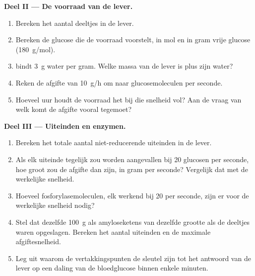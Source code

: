 \begin{problem}
\medskip
\noindent\textbf{Deel II --- De voorraad van de lever.}
\begin{enumerate}[resume]
  \item Bereken het aantal deeltjes in de lever.
  \item Bereken de glucose die de voorraad voorstelt, in mol en in gram
        vrije glucose (\qty{180}{g/mol}).
  \item {} bindt \qty{3}{g} water per gram. Welke massa van de lever
        is  plus zijn water?
  \item Reken de afgifte van \qty{10}{g/h} om naar glucosemoleculen per
        seconde.
  \item Hoeveel uur houdt de voorraad het bij die snelheid vol? Aan de
        vraag van welk  komt de afgifte vooral tegemoet?
\end{enumerate}

\medskip
\noindent\textbf{Deel III --- Uiteinden en enzymen.}
\begin{enumerate}[resume]
  \item Bereken het totale aantal niet-reducerende uiteinden in de lever.
  \item Als elk uiteinde tegelijk zou worden aangevallen bij \qty{20}{}
        glucosen per seconde, hoe groot zou de afgifte dan zijn, in gram
        per seconde? Vergelijk dat met de werkelijke snelheid.
  \item Hoeveel fosforylasemoleculen, elk werkend bij \qty{20}{} per
        seconde, zijn er voor de werkelijke snelheid nodig?
  \item Stel dat dezelfde \qty{100}{g} als amyloseketens van dezelfde
        grootte als de deeltjes waren opgeslagen. Bereken het aantal
        uiteinden en de maximale afgiftesnelheid.
  \item Leg uit waarom de vertakkingspunten de sleutel zijn tot het
        antwoord van de lever op een daling van de bloedglucose binnen
        enkele minuten.
\end{enumerate}


\end{problem}
